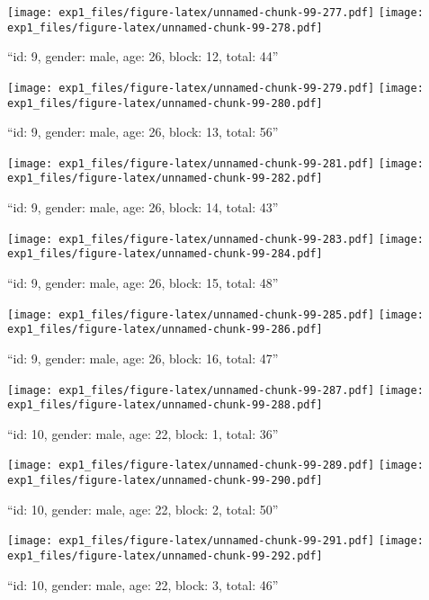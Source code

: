 \documentclass[,]{article}
\begin{document}
\texttt{[image: exp1\_files/figure-latex/unnamed-chunk-99-277.pdf]}
\texttt{[image: exp1\_files/figure-latex/unnamed-chunk-99-278.pdf]}

\newpage
[1] 

``id: 9, gender: male, age: 26, block: 12, total: 44''

\texttt{[image: exp1\_files/figure-latex/unnamed-chunk-99-279.pdf]}
\texttt{[image: exp1\_files/figure-latex/unnamed-chunk-99-280.pdf]}

\newpage
[1] 

``id: 9, gender: male, age: 26, block: 13, total: 56''

\texttt{[image: exp1\_files/figure-latex/unnamed-chunk-99-281.pdf]}
\texttt{[image: exp1\_files/figure-latex/unnamed-chunk-99-282.pdf]}

\newpage
[1] 

``id: 9, gender: male, age: 26, block: 14, total: 43''

\texttt{[image: exp1\_files/figure-latex/unnamed-chunk-99-283.pdf]}
\texttt{[image: exp1\_files/figure-latex/unnamed-chunk-99-284.pdf]}

\newpage
[1] 

``id: 9, gender: male, age: 26, block: 15, total: 48''

\texttt{[image: exp1\_files/figure-latex/unnamed-chunk-99-285.pdf]}
\texttt{[image: exp1\_files/figure-latex/unnamed-chunk-99-286.pdf]}

\newpage
[1] 

``id: 9, gender: male, age: 26, block: 16, total: 47''

\texttt{[image: exp1\_files/figure-latex/unnamed-chunk-99-287.pdf]}
\texttt{[image: exp1\_files/figure-latex/unnamed-chunk-99-288.pdf]}

\newpage
[1] 

``id: 10, gender: male, age: 22, block: 1, total: 36''

\texttt{[image: exp1\_files/figure-latex/unnamed-chunk-99-289.pdf]}
\texttt{[image: exp1\_files/figure-latex/unnamed-chunk-99-290.pdf]}

\newpage
[1] 

``id: 10, gender: male, age: 22, block: 2, total: 50''

\texttt{[image: exp1\_files/figure-latex/unnamed-chunk-99-291.pdf]}
\texttt{[image: exp1\_files/figure-latex/unnamed-chunk-99-292.pdf]}

\newpage
[1] 

``id: 10, gender: male, age: 22, block: 3, total: 46''
\end{document}
